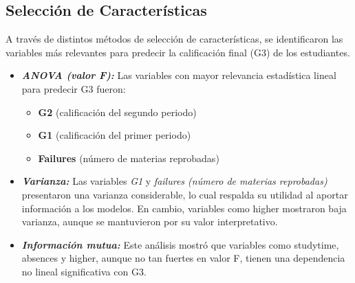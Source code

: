 \documentclass{article}
\begin{document}
\subsection*{Selección de Características}

A través de distintos métodos de selección de características, se identificaron las variables más relevantes para predecir la calificación final (G3) de los estudiantes.
\begin{itemize}[label=\textendash]

\item {\textit{\textbf{ANOVA (valor F):}}}
Las variables con mayor relevancia estadística lineal para predecir G3 fueron:
    \begin{itemize}[label=\--] %
    \item \textbf{G2} (calificación del segundo periodo)
    \item \textbf{G1} (calificación del primer periodo)
    \item \textbf{Failures} (número de materias reprobadas)
    \end{itemize}
    
\item {\textbf{\textit{Varianza:}}} 
Las variables \textit{G1} y \textit{failures (número de materias reprobadas)} presentaron una varianza considerable, lo cual respalda su utilidad al aportar información a los modelos. En cambio, variables como higher mostraron baja varianza, aunque se mantuvieron por su valor interpretativo.

\item {\textbf{\textit{Información mutua:}}}
Este análisis mostró que variables como studytime, absences y higher, aunque no tan fuertes en valor F, tienen una dependencia no lineal significativa con G3.


\end{itemize}
\end{document}
